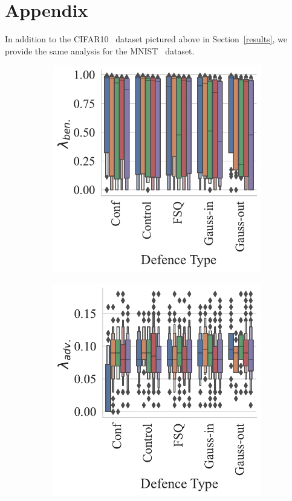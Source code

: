 \section{Appendix}
\label{appendix}
In addition to the CIFAR10~\citep{cifar} dataset pictured above in Section~\ref{results}, we provide the same analysis for the MNIST~\citep{mnist} dataset.

\begin{figure}
\begin{subfigure}[]{0.27\textwidth}
    \centering
    \includegraphics[width=\textwidth]{mnist/ben_accuracy_vs_defence_type.pdf}
\end{subfigure}
\begin{subfigure}[]{0.27\textwidth}
    \centering
    \includegraphics[width=\textwidth]{mnist/adv_accuracy_vs_defence_type.pdf}

\end{subfigure}
\end{figure}
